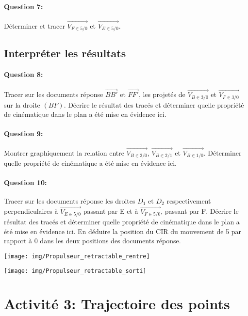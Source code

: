 \reponse[1]

\paragraph{Question 7:} Déterminer et tracer $\overrightarrow{V_{F\in 5/0}}$ et $\overrightarrow{V_{E\in 5/0}}$.

\reponse[1]

\subsection{Interpréter les résultats}
	
\paragraph{Question 8:} Tracer sur les documents réponse $\overrightarrow{BB'}$ et $\overrightarrow{FF'}$, les projetés de $\overrightarrow{V_{B\in 3/0}}$ et $\overrightarrow{V_{F\in 3/0}}$ sur la droite $(BF)$. Décrire le résultat des tracés et déterminer quelle propriété de cinématique dans le plan a été mise en évidence ici.

\paragraph{Question 9:} Montrer graphiquement la relation entre $\overrightarrow{V_{B\in 2/0}}$, $\overrightarrow{V_{B\in 2/1}}$ et $\overrightarrow{V_{B\in 1/0}}$. Déterminer quelle propriété de cinématique a été mise en évidence ici.

\paragraph{Question 10:} Tracer sur les documents réponse les droites $D_1$ et $D_2$ respectivement perpendiculaires à $\overrightarrow{V_{E\in 5/0}}$ passant par E et à $\overrightarrow{V_{F\in 5/0}}$, passant par F. Décrire le résultat des tracés et déterminer quelle propriété de cinématique dans le plan a été mise en évidence ici. En déduire la position du CIR du mouvement de 5 par rapport à 0 dans les deux positions des documents réponse.

\texttt{[image: img/Propulseur\_retractable\_rentre]}

\vspace{2cm}

\texttt{[image: img/Propulseur\_retractable\_sorti]}

\section{Activité 3: Trajectoire des points}

